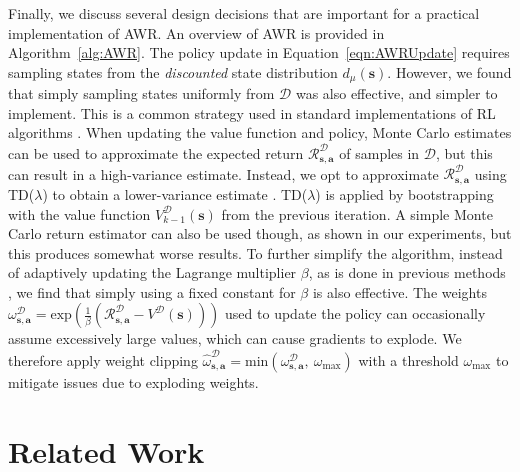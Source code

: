 \documentclass{article} \usepackage{iclr2020_conference,times}
\def\rva{{\mathbf{a}}}
\def\rvs{{\mathbf{s}}}
\begin{document}
Finally, we discuss several design decisions that are important for a practical implementation of AWR. An overview of AWR is provided in Algorithm~\ref{alg:AWR}. The policy update in Equation~\ref{eqn:AWRUpdate} requires sampling states from the \emph{discounted} state distribution $d_\mu(\rvs)$. However, we found that simply sampling states uniformly from $\mathcal{D}$ was also effective, and simpler to implement. This is a common strategy used in standard implementations of RL algorithms \citep{baselines}. When updating the value function and policy, Monte Carlo estimates can be used to approximate the expected return $\mathcal{R}_{\rvs,\rva}^\mathcal{D}$ of samples in $\mathcal{D}$, but this can result in a high-variance estimate. Instead, we opt to approximate $\mathcal{R}_{\rvs,\rva}^\mathcal{D}$ using TD($\lambda$) to obtain a lower-variance estimate \citep{Sutton1998}. TD($\lambda$) is applied by bootstrapping with the value function $V_{k-1}^\mathcal{D}(\rvs)$ from the previous iteration. A simple Monte Carlo return estimator can also be used though, as shown in our experiments, but this produces somewhat worse results.
To further simplify the algorithm, instead of adaptively updating the Lagrange multiplier $\beta$, as is done in previous methods \citep{Peters2007RWR,Peters2010REP,abdolmaleki2018maximum}, we find that simply using a fixed constant for $\beta$ is also effective. The weights $\omega_{\rvs, \rva}^\mathcal{D} = \mathrm{exp}\left( \frac{1}{\beta} \left( \mathcal{R}_{\rvs,\rva}^\mathcal{D} - V^\mathcal{D}(\rvs) \right) \right)$ used to update the policy can occasionally assume excessively large values, which can cause gradients to explode. We therefore apply weight clipping $\hat{\omega}_{\rvs, \rva}^\mathcal{D} = \mathrm{min}\left(\omega_{\rvs, \rva}^\mathcal{D}, \ \omega_{\max}\right)$ with a threshold $\omega_{\max}$ to mitigate issues due to exploding weights.

\section{Related Work}
\end{document}
